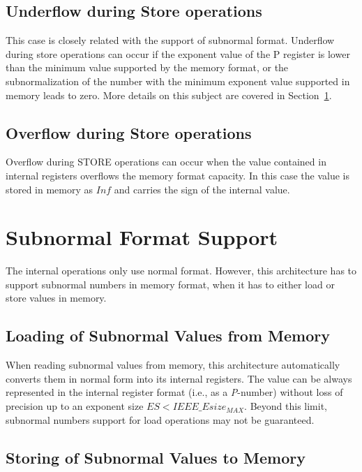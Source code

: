 \subsection{Underflow during Store operations}

This case is closely related with the support of subnormal format.
Underflow during store operations can occur if the exponent value of the P register is lower than the minimum value supported by the memory format, or the subnormalization of the number with the minimum exponent value supported in memory leads to zero.
More details on this subject are covered in Section~\ref{sec:subnormalFormatSupport}.

\subsection{Overflow during Store operations}

Overflow during STORE operations can occur when the value contained in internal registers overflows the memory format capacity.
In this case the value is stored in memory as $Inf$ and carries the sign of the internal value.

\section{Subnormal Format Support}

\label{sec:subnormalFormatSupport}

The internal operations only use normal format.
However, this architecture has to support subnormal numbers in memory format, when it has to either load or store values in memory.

\subsection{Loading of Subnormal Values from Memory}

When reading subnormal values from memory, this architecture automatically converts them in normal form into its internal registers.
The value can be always represented in the internal register format (i.e., as a {\em P}-number) without loss of precision up to an exponent size $ES < IEEE\_Esize_{MAX}$.
Beyond this limit, subnormal numbers support for load operations may not be guaranteed.

\subsection{Storing of Subnormal Values to Memory}

